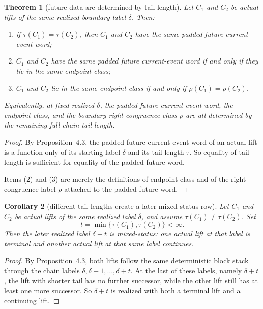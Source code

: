 \documentclass[11pt]{article}
\newtheorem{theorem}{Theorem}[section]
\newtheorem{corollary}[theorem]{Corollary}
\begin{document}
\begin{theorem}[future data are determined by tail length]
Let $C_1$ and $C_2$ be actual lifts of the same realized boundary label
$\delta$. Then:
\begin{enumerate}[label=\textup{(\arabic*)},leftmargin=2.5em]
\item if $\tau(C_1)=\tau(C_2)$, then $C_1$ and $C_2$ have the same padded
      future current-event word;
\item $C_1$ and $C_2$ have the same padded future current-event word if and
      only if they lie in the same endpoint class;
\item $C_1$ and $C_2$ lie in the same endpoint class if and only if
      $\rho(C_1)=\rho(C_2)$.
\end{enumerate}
Equivalently, at fixed realized $\delta$, the padded future current-event word,
the endpoint class, and the boundary right-congruence class $\rho$ are all
determined by the remaining full-chain tail length.
\end{theorem}

\begin{proof}
By Proposition~4.3, the padded future current-event word of an actual lift is a
function only of its starting label $\delta$ and its tail length $\tau$. So
equality of tail length is sufficient for equality of the padded future word.

Items \textup{(2)} and \textup{(3)} are merely the definitions of endpoint
class and of the right-congruence label $\rho$ attached to the padded future
word.
\end{proof}

\begin{corollary}[different tail lengths create a later mixed-status row]
Let $C_1$ and $C_2$ be actual lifts of the same realized label $\delta$, and
assume $\tau(C_1)\neq\tau(C_2)$. Set
\[
t=\min\{\tau(C_1),\tau(C_2)\}<\infty.
\]
Then the later realized label $\delta+t$ is mixed-status: one actual lift at
that label is terminal and another actual lift at that same label continues.
\end{corollary}

\begin{proof}
By Proposition~4.3, both lifts follow the same deterministic block stack
through the chain labels $\delta,\delta+1,\dots,\delta+t$. At the last of these
labels, namely $\delta+t$, the lift with shorter tail has no further successor,
while the other lift still has at least one more successor. So $\delta+t$ is
realized with both a terminal lift and a continuing lift.
\end{proof}
\end{document}
